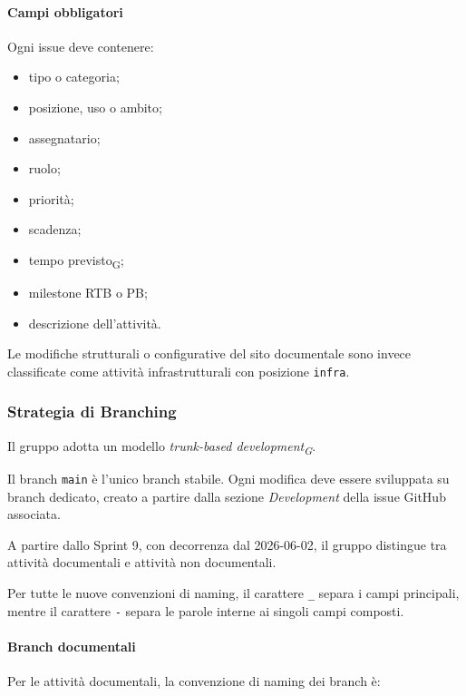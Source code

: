 \paragraph{Campi obbligatori}

Ogni issue deve contenere:

\begin{itemize}
    \item tipo o categoria;
    \item posizione, uso o ambito;
    \item assegnatario;
    \item ruolo;
    \item priorità;
    \item scadenza;
    \item tempo previsto\textsubscript{G};
    \item milestone RTB o PB;
    \item descrizione dell'attività.
\end{itemize}

Le modifiche strutturali o configurative del sito documentale sono invece
classificate come attività infrastrutturali con posizione \texttt{infra}.


\subsubsection{Strategia di Branching}

Il gruppo adotta un modello \textit{trunk-based development\textsubscript{G}}.

Il branch \texttt{main} è l'unico branch stabile. Ogni modifica deve essere sviluppata su branch dedicato, creato a partire dalla
sezione \textit{Development} della issue GitHub associata.

A partire dallo Sprint 9, con decorrenza dal 2026-06-02, il gruppo distingue tra
attività documentali e attività non documentali.

Per tutte le nuove convenzioni di naming, il carattere \texttt{\_} separa i campi
principali, mentre il carattere \texttt{-} separa le parole interne ai singoli
campi composti.

\paragraph{Branch documentali}

Per le attività documentali, la convenzione di naming dei branch è:

